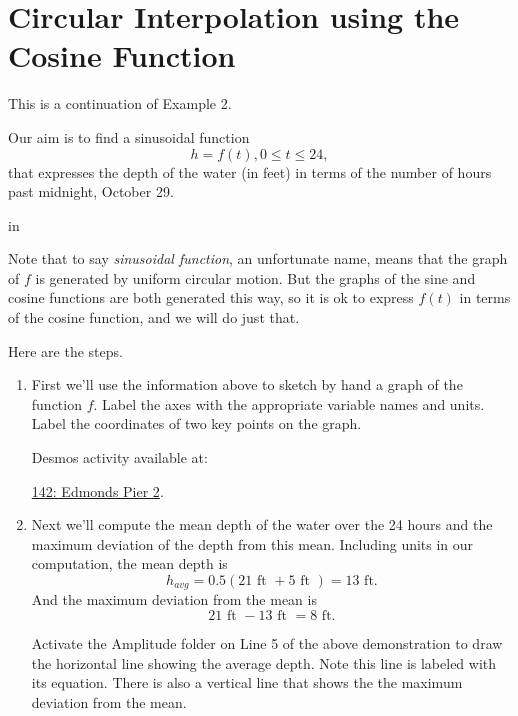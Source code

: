 \documentclass{ximera}
\newcommand{\pskip}{\vskip 0.1 in}
\begin{document}
\section{Circular Interpolation using the Cosine Function}

\begin{example} \label{EODOFDSFSD}


This is a continuation of Example 2.

Our aim is to find a sinusoidal function
\[
    h = f(t) , 0\leq t \leq 24, 
\]
that expresses the depth of the water (in feet) in terms of the number of hours past midnight, October 29. 

\pskip

Note that to say \emph{sinusoidal function}, an unfortunate name, means that the graph of $f$ is generated by uniform circular motion. But the graphs of the sine and cosine functions are both generated this way, so it is ok to express $f(t)$ in terms of the cosine function, and we will do just that.

\begin{explanation}
Here are the steps.

\begin{enumerate}

\item  First we'll use the information above to sketch by hand a graph of the function $f$. Label the axes with the appropriate variable names and units. Label the coordinates of two key points on the graph.

Desmos activity available at:

\href{https://www.desmos.com/calculator/cxybepr3od}{142: Edmonds Pier 2}.

 
\begin{onlineOnly}
    \begin{center}
\end{center}
\end{onlineOnly}



\item Next we'll compute the mean depth of the water over the 24 hours and the maximum deviation of the depth from this mean. Including units in our computation, the mean depth is 
\[
    h_{avg} = 0.5 ( 21 \text{ ft } + 5 \text{ ft }) = 13 \text{ ft} . 
\]
And the maximum deviation from the mean is
\[
     21 \text{ ft } - 13 \text{ ft } = 8 \text{ ft}.
\]

Activate the Amplitude folder on Line 5 of the above demonstration to draw the horizontal line showing the average depth. Note this line is labeled with its equation. There is also a vertical line that shows the the maximum deviation from the mean.


\end{enumerate}
\end{explanation}
\end{example}
\end{document}
